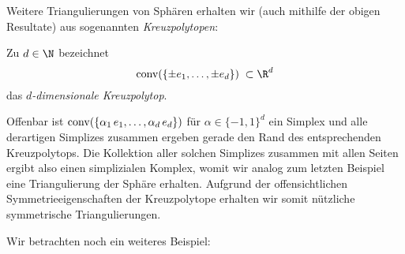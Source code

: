 Weitere Triangulierungen von Sphären erhalten wir (auch mithilfe der obigen
Resultate) aus sogenannten \emph{Kreuzpolytopen}:

\begin{thDef}[Kreuzpolytop]
    Zu $d\in\N$ bezeichnet
    \[ \conv(\{ \pm e_1, \ldots, \pm e_d \}) \;\subset\R^d \]
    das \emph{$d$-dimensionale Kreuzpolytop}.
\end{thDef}


Offenbar ist $\operatorname{conv}(\{\alpha_1\,e_1,\ldots,\alpha_d\,e_d\})$ für
$\alpha\in\{-1,1\}^d$ ein Simplex und alle derartigen Simplizes zusammen ergeben
gerade den Rand des entsprechenden Kreuzpolytops. Die Kollektion aller solchen
Simplizes zusammen mit allen Seiten ergibt also einen simplizialen Komplex,
womit wir analog zum letzten Beispiel eine Triangulierung der Sphäre erhalten.
Aufgrund der offensichtlichen Symmetrieeigenschaften der Kreuzpolytope erhalten
wir somit nützliche symmetrische Triangulierungen. 

Wir betrachten noch ein weiteres Beispiel:

